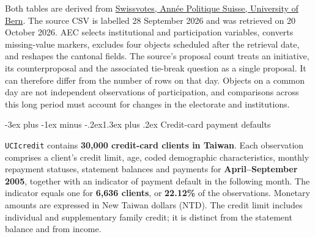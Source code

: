 \documentclass[
  11pt,
]{book}
\makeatletter
\renewcommand\section{\@startsection{section}{1}{\z@}
  {-3ex plus -1ex minus -.2ex}{1.3ex plus .2ex}
  {\normalfont\Large\bfseries\color{TextbookInk}}}
\theoremstyle{definition}
\theoremstyle{definition}
\theoremstyle{definition}
\theoremstyle{definition}
\theoremstyle{remark}
\makeatother
\begin{document}
Both tables are derived from \href{https://swissvotes.ch/page/dataset}{Swissvotes, Année Politique Suisse, University of Bern}. The source CSV is labelled 28 September 2026 and was retrieved on 20 October 2026. AEC selects institutional and participation variables, converts missing-value markers, excludes four objects scheduled after the retrieval date, and reshapes the cantonal fields. The source's proposal count treats an initiative, its counterproposal and the associated tie-break question as a single proposal. It can therefore differ from the number of rows on that day. Objects on a common day are not independent observations of participation, and comparisons across this long period must account for changes in the electorate and institutions.

\section{Credit-card payment defaults}\label{data-credit}

\texttt{UCIcredit} contains \textbf{30,000 credit-card clients in Taiwan}. Each observation comprises a client's credit limit, age, coded demographic characteristics, monthly repayment statuses, statement balances and payments for \textbf{April--September 2005}, together with an indicator of payment default in the following month. The indicator equals one for \textbf{6,636 clients}, or \textbf{22.12\%} of the observations. Monetary amounts are expressed in New Taiwan dollars (NTD). The credit limit includes individual and supplementary family credit; it is distinct from the statement balance and from income.
\end{document}
